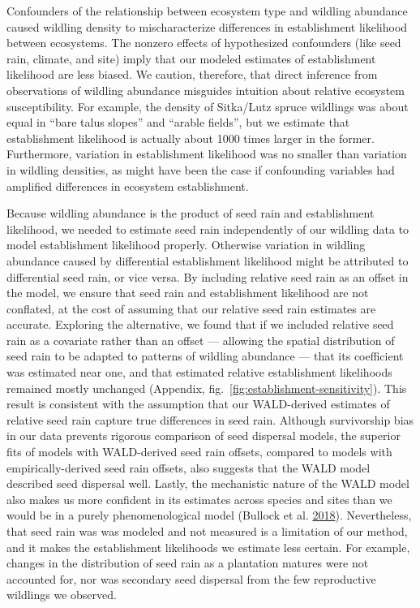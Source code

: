 \documentclass[
]{article}
\begin{document}
Confounders of the relationship between ecosystem type and wildling abundance caused wildling density to mischaracterize differences in establishment likelihood between ecosystems.
The nonzero effects of hypothesized confounders (like seed rain, climate, and site) imply that our modeled estimates of establishment likelihood are less biased.
We caution, therefore, that direct inference from observations of wildling abundance misguides intuition about relative ecosystem susceptibility.
For example, the density of Sitka/Lutz spruce wildlings was about equal in ``bare talus slopes'' and ``arable fields'', but we estimate that establishment likelihood is actually about 1000 times larger in the former.
Furthermore, variation in establishment likelihood was no smaller than variation in wildling densities, as might have been the case if confounding variables had amplified differences in ecosystem establishment.

Because wildling abundance is the product of seed rain and establishment likelihood, we needed to estimate seed rain independently of our wildling data to model establishment likelihood properly.
Otherwise variation in wildling abundance caused by differential establishment likelihood might be attributed to differential seed rain, or vice versa.
By including relative seed rain as an offset in the model, we ensure that seed rain and establishment likelihood are not conflated, at the cost of assuming that our relative seed rain estimates are accurate.
Exploring the alternative, we found that if we included relative seed rain as a covariate rather than an offset --- allowing the spatial distribution of seed rain to be adapted to patterns of wildling abundance --- that its coefficient was estimated near one, and that estimated relative establishment likelihoods remained mostly unchanged (Appendix, fig.~\ref{fig:establishment-sensitivity}).
This result is consistent with the assumption that our WALD-derived estimates of relative seed rain capture true differences in seed rain.
Although survivorship bias in our data prevents rigorous comparison of seed dispersal models, the superior fits of models with WALD-derived seed rain offsets, compared to models with empirically-derived seed rain offsets, also suggests that the WALD model described seed dispersal well.
Lastly, the mechanistic nature of the WALD model also makes us more confident in its estimates across species and sites than we would be in a purely phenomenological model (Bullock et al. \protect\hyperlink{ref-bullockAllDispersalFunctions2018}{2018}).
Nevertheless, that seed rain was was modeled and not measured is a limitation of our method, and it makes the establishment likelihoods we estimate less certain.
For example, changes in the distribution of seed rain as a plantation matures were not accounted for, nor was secondary seed dispersal from the few reproductive wildlings we observed.
\end{document}
